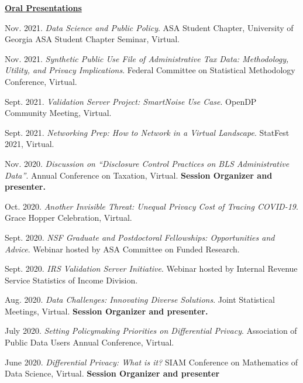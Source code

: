 \documentclass[11pt, letterpaper, roman]{moderncv} %
\begin{document}
\begin{etaremune}[topsep=0pt, itemsep=6pt, partopsep=0pt, parsep=0pt]
\vspace{6pt}
\hspace{-0.30in}\underline{\textbf{\large Oral Presentations}}\normalsize
    \item Nov. 2021. \textit{Data Science and Public Policy}. ASA Student Chapter, University of Georgia ASA Student Chapter Seminar, Virtual.
    
    \item Nov. 2021. \textit{Synthetic Public Use File of Administrative Tax Data: Methodology, Utility, and Privacy Implications}. Federal Committee on Statistical Methodology Conference, Virtual.
    
    \item Sept. 2021. \textit{Validation Server Project: SmartNoise Use Case}. OpenDP Community Meeting, Virtual.
    
    \item Sept. 2021. \textit{Networking Prep: How to Network in a Virtual Landscape}. StatFest 2021, Virtual.
    
    \item Nov. 2020. \textit{Discussion on ``Disclosure Control Practices on BLS Administrative Data''}. Annual Conference on Taxation, Virtual. \textbf{Session Organizer and presenter.}
    
    \item Oct. 2020. \textit{Another Invisible Threat: Unequal Privacy Cost of Tracing COVID-19}. Grace Hopper Celebration, Virtual.
    
    \item Sept. 2020. \textit{NSF Graduate and Postdoctoral Fellowships: Opportunities and Advice}. Webinar hosted by ASA Committee on Funded Research.
    
    \item Sept. 2020. \textit{IRS Validation Server Initiative}. Webinar hosted by Internal Revenue Service Statistics of Income Division.
    
    \item Aug. 2020. \textit{Data Challenges: Innovating Diverse Solutions}. Joint Statistical Meetings, Virtual. \textbf{Session Organizer and presenter.}
    
    \item July 2020. \textit{Setting Policymaking Priorities on Differential Privacy}. Association of Public Data Users Annual Conference, Virtual.
    
    \item June 2020. \textit{Differential Privacy: What is it?} SIAM Conference on Mathematics of Data Science, Virtual. \textbf{Session Organizer and presenter}
    

\end{etaremune}
\end{document}
